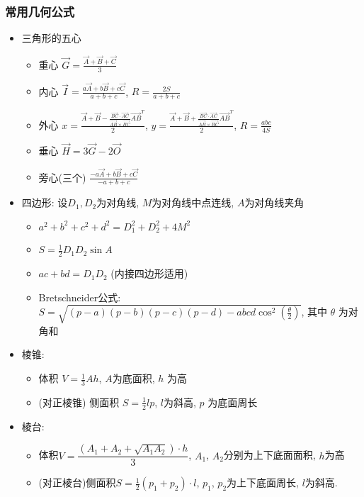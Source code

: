 \documentclass[landscape, twocolumn, 8pt, a4paper, twoside]{extarticle}
\begin{document}
\subsubsection{常用几何公式}
\begin{itemize}
\item 三角形的五心
  \begin{itemize}
  \item 重心 $\overrightarrow{G} = \frac{\overrightarrow{A} + \overrightarrow{B} + \overrightarrow{C}}{3}$
  \item
    内心 $\overrightarrow{I} = \frac{a\overrightarrow{A} + b\overrightarrow{B} + c\overrightarrow{C}}{a + b + c}$,
    $R = \frac{2S}{a + b + c}$
  \item
    外心
    $x = \frac{\overrightarrow{A} + \overrightarrow{B} - \frac{\overrightarrow{BC} \cdot \overrightarrow{AC}}{\overrightarrow{AB} \times \overrightarrow{BC}} \overrightarrow{AB}^{T}}{2}$,
    $y = \frac{\overrightarrow{A} + \overrightarrow{B} + \frac{\overrightarrow{BC} \cdot \overrightarrow{AC}}{\overrightarrow{AB} \times \overrightarrow{BC}} \overrightarrow{AB}^{T}}{2}$,
    $R = \frac{abc}{4S}$
  \item
    垂心 $\overrightarrow{H} = 3\overrightarrow{G} - 2\overrightarrow{O}$
  \item
    旁心(三个) $\frac{-a\overrightarrow{A} + b\overrightarrow{B} + c\overrightarrow{C}}{-a + b + c}$
  \end{itemize}

\item 四边形: 设$D_1, D_2$为对角线, $M$为对角线中点连线, $A$为对角线夹角
  \begin{itemize}
  \item $a^2 + b^2 + c^2 + d^2 = D_1^2 + D_2 ^ 2 + 4 M^2$
  \item $S = \frac{1}{2} D_1  D_2 \sin A$
  \item $ac + bd = D_1 D_2$ (内接四边形适用)
  \item Bretschneider公式:
    $S = \sqrt{(p - a)(p - b)(p - c)(p - d) - abcd \cos^2(\frac{\theta}{2})}$, 其中 $\theta$ 为对角和
  \end{itemize}
\item 棱锥:
  \begin{itemize}
  \item 体积 $V = \frac{1}{3}Ah$, $A$为底面积, $h$ 为高
  \item (对正棱锥) 侧面积 $S = \frac{1}{2} lp $, $l$为斜高, $p$ 为底面周长
  \end{itemize}
\item 棱台:
  \begin{itemize}
  \item 体积$V = \dfrac{(A_1 + A_2 + \sqrt{A_1 A_2}) \cdot h}{3}$, $A_1$, $A_2$分别为上下底面面积, $h$为高
  \item (对正棱台)侧面积$S = \frac{1}{2} (p_1 + p_2) \cdot l$, $p_1$, $p_2$为上下底面周长, $l$为斜高. 
  \end{itemize}
\end{itemize}
\end{document}

